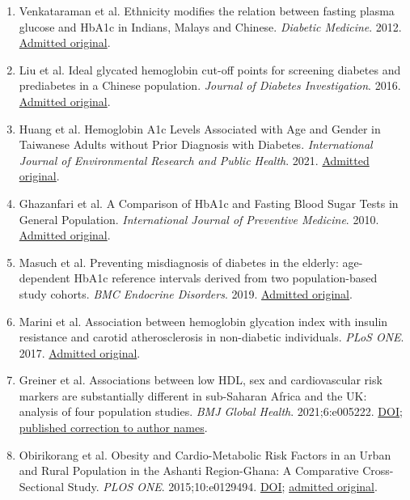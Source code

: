 \documentclass[sigconf,anonymous,review]{acmart}
\begin{document}
\begin{enumerate}
\item Venkataraman et al. Ethnicity modifies the relation between fasting plasma glucose and HbA1c in Indians, Malays and Chinese. \emph{Diabetic Medicine}. 2012. \href{https://pmc.ncbi.nlm.nih.gov/articles/PMC3504343/}{Admitted original}.

\item Liu et al. Ideal glycated hemoglobin cut-off points for screening diabetes and prediabetes in a Chinese population. \emph{Journal of Diabetes Investigation}. 2016. \href{https://pmc.ncbi.nlm.nih.gov/articles/PMC5009131/}{Admitted original}.

\item Huang et al. Hemoglobin A1c Levels Associated with Age and Gender in Taiwanese Adults without Prior Diagnosis with Diabetes. \emph{International Journal of Environmental Research and Public Health}. 2021. \href{https://pmc.ncbi.nlm.nih.gov/articles/PMC8038122/}{Admitted original}.

\item Ghazanfari et al. A Comparison of HbA1c and Fasting Blood Sugar Tests in General Population. \emph{International Journal of Preventive Medicine}. 2010. \href{https://pmc.ncbi.nlm.nih.gov/articles/PMC3075530/}{Admitted original}.

\item Masuch et al. Preventing misdiagnosis of diabetes in the elderly: age-dependent HbA1c reference intervals derived from two population-based study cohorts. \emph{BMC Endocrine Disorders}. 2019. \href{https://pmc.ncbi.nlm.nih.gov/articles/PMC6371438/}{Admitted original}.

\item Marini et al. Association between hemoglobin glycation index with insulin resistance and carotid atherosclerosis in non-diabetic individuals. \emph{PLoS ONE}. 2017. \href{https://pmc.ncbi.nlm.nih.gov/articles/PMC5398507/}{Admitted original}.

\item Greiner et al. Associations between low HDL, sex and cardiovascular risk markers are substantially different in sub-Saharan Africa and the UK: analysis of four population studies. \emph{BMJ Global Health}. 2021;6:e005222. \href{https://doi.org/10.1136/bmjgh-2021-005222}{DOI}; \href{https://gh.bmj.com/content/6/6/e005222corr1}{published correction to author names}.

\item Obirikorang et al. Obesity and Cardio-Metabolic Risk Factors in an Urban and Rural Population in the Ashanti Region-Ghana: A Comparative Cross-Sectional Study. \emph{PLOS ONE}. 2015;10:e0129494. \href{https://doi.org/10.1371/journal.pone.0129494}{DOI}; \href{https://journals.plos.org/plosone/article?id=10.1371/journal.pone.0129494}{admitted original}.


\end{enumerate}
\end{document}
